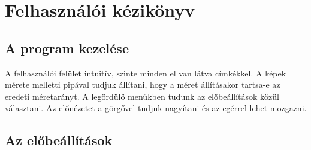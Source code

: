 \chapter{Felhasználói kézikönyv}

\section{A program kezelése}

A felhasználói felület intuitív, szinte minden el van látva címkékkel. 
A képek mérete melletti pipával tudjuk állítani, hogy a méret állításakor tartsa-e az eredeti méretarányt.
A legördülő menükben tudunk az előbeállítások közül választani. 
Az előnézetet a görgővel tudjuk nagyítani és az egérrel lehet mozgazni.

\section{Az előbeállítások}

